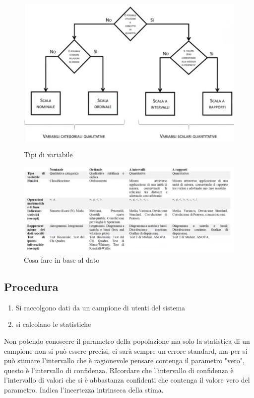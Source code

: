 \documentclass[11pt,a4paper]{book}
\begin{document}
\begin{figure}[h!]
	\begin{center}
		\includegraphics[scale=0.6]{img/023.jpg}
		\caption{Tipi di variabile}
		\label{fig: 023}
	\end{center}
	\begin{center}
		\includegraphics[scale=0.6]{img/024.jpg}
		\caption{Cosa fare in base al dato}
		\label{fig: 024}
	\end{center}	
\end{figure}

\subsection{Procedura}
\begin{enumerate}
	\item Si raccolgono dati da un campione di utenti del sistema
	\item si calcolano le statistiche
\end{enumerate}

Non potendo conoscere il parametro della popolazione ma solo la statistica di un campione non si può essere precisi, ci sarà sempre un errore standard, ma per si può stimare l'intervallo che è ragionevole pensare contenga il parametro "vero", questo è l'intervallo di confidenza. RIcordare che l'intervallo di confidenza è l'intervallo di valori che si è abbastanza confidenti che contenga il valore vero del parametro. Indica l'incertezza intrinseca della stima.
\end{document}
